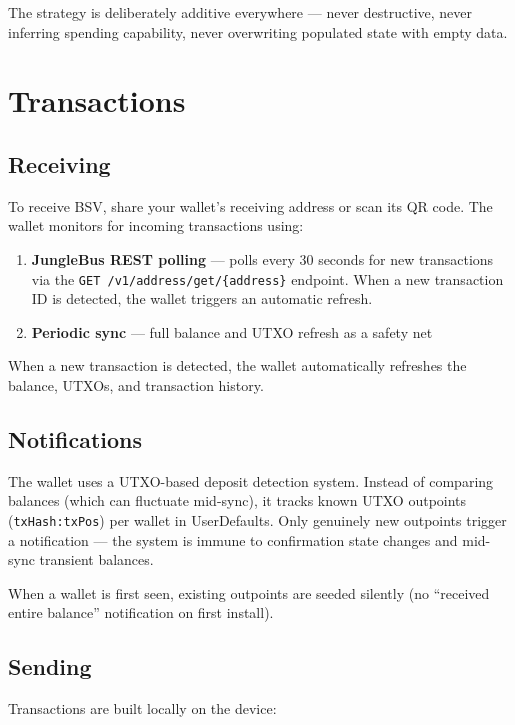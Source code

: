 \documentclass[a4paper, 11pt, openany]{book}
\begin{document}
The strategy is deliberately additive everywhere --- never destructive, never inferring spending capability, never overwriting populated state with empty data.

\section{Transactions}

\subsection{Receiving}

To receive BSV, share your wallet's receiving address or scan its QR code. The wallet monitors for incoming transactions using:

\begin{enumerate}
\item \textbf{JungleBus REST polling} --- polls every 30 seconds for new transactions via the \texttt{GET /v1/address/get/\{address\}} endpoint. When a new transaction ID is detected, the wallet triggers an automatic refresh.
\item \textbf{Periodic sync} --- full balance and UTXO refresh as a safety net
\end{enumerate}

When a new transaction is detected, the wallet automatically refreshes the balance, UTXOs, and transaction history.

\subsection{Notifications}

The wallet uses a UTXO-based deposit detection system. Instead of comparing balances (which can fluctuate mid-sync), it tracks known UTXO outpoints (\texttt{txHash:txPos}) per wallet in UserDefaults. Only genuinely new outpoints trigger a notification --- the system is immune to confirmation state changes and mid-sync transient balances.

When a wallet is first seen, existing outpoints are seeded silently (no ``received entire balance'' notification on first install).

\subsection{Sending}

Transactions are built locally on the device:
\end{document}

